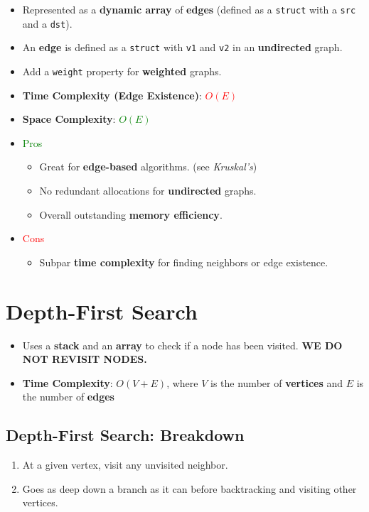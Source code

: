 \documentclass[12pt, letterpaper]{article}
\begin{document}
\begin{itemize}
    \item Represented as a \textbf{dynamic array} of \textbf{edges} (defined as a \texttt{struct} with a \texttt{src} and a \texttt{dst}).
    \item An \textbf{edge} is defined as a \texttt{struct} with \texttt{v1} and \texttt{v2} in an \textbf{undirected} graph.
    \item Add a \texttt{weight} property for \textbf{weighted} graphs.
    \item \textbf{Time Complexity (Edge Existence)}: \textcolor{red}{ $ O(E) $ }
    \item \textbf{Space Complexity}: \textcolor{green}{$ O(E) $}
    \item \textcolor{green}{Pros}
        \begin{itemize}
            \item Great for \textbf{edge-based} algorithms. (see \textit{Kruskal's})
            \item No redundant allocations for \textbf{undirected} graphs.
            \item Overall outstanding \textbf{memory efficiency}.
        \end{itemize}
    \item \textcolor{red}{Cons}
        \begin{itemize}
            \item Subpar \textbf{time complexity} for finding neighbors or edge existence.
        \end{itemize}
\end{itemize}

\section*{Depth-First Search}

\begin{itemize}
    \item Uses a \textbf{stack} and an \textbf{array} to check if a node has been visited. \textbf{WE DO NOT REVISIT NODES.}
    \item \textbf{Time Complexity}: $ O(V + E) $, where $ V $ is the number of \textbf{vertices} and $ E $ is the number of \textbf{edges}
\end{itemize}

\subsection*{Depth-First Search: Breakdown}
\begin{enumerate}
    \item At a given vertex, visit any unvisited neighbor.
    \item Goes as deep down a branch as it can before backtracking and visiting other vertices.
\end{enumerate}
\end{document}
